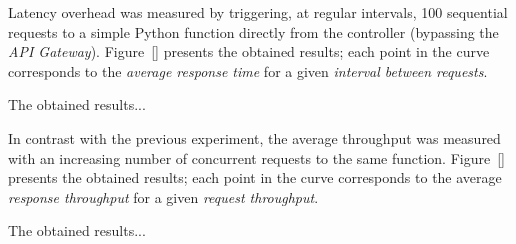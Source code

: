 Latency overhead was measured by triggering, at regular intervals, 100 sequential requests to a simple Python function directly from the controller (bypassing the \textit{API Gateway}). Figure~\ref{} presents the obtained results; each point in the curve corresponds to the \textit{average response time} for a given \textit{interval between requests}.

The obtained results...

In contrast with the previous experiment, the average throughput was measured with an increasing number of concurrent requests to the same function. Figure~\ref{} presents the obtained results; each point in the curve corresponds to the average \textit{response throughput} for a given \textit{request throughput}.

The obtained results...

